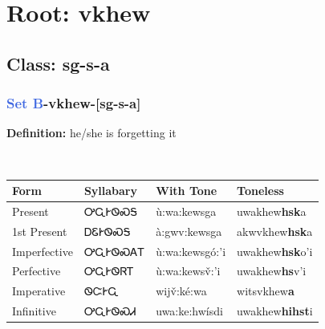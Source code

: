 \needspace{4in}
\section*{Root: vkhew}
\nopagebreak
{}
\needspace{3in}
\subsection*{Class: sg-s-a}
\nopagebreak
\needspace{2in}
\subsubsection*{\textcolor{RoyalBlue}{Set B}{-}\textbf{vkhew}{-}[sg-s-a]}
\nopagebreak
\textbf{Definition: } he/she is forgetting it
\\[0.5em]
\begin{tabularx}{\textwidth}{l X X X}%
\toprule%
\textbf{Form}&\textbf{Syllabary}&\textbf{With Tone}&\textbf{Toneless}\\%
\midrule%
Present&ᎤᏩᎨᏫᏍᎦ&ù:wa:kewsga&uwakhew\textbf{hsk}a\\%
1st Present&ᎠᏋᎨᏫᏍᎦ&à:gwv:kewsga&akwvkhew\textbf{hsk}a\\%
Imperfective&ᎤᏩᎨᏫᏍᎪᎢ&ù:wa:kewsgó:’i&uwakhew\textbf{hsk}o'i\\%
Perfective&ᎤᏩᎨᏫᏒᎢ&ù:wa:kewsv̌:’i&uwakhew\textbf{hs}v'i\\%
Imperative&ᏫᏨᎨᏩ&wijv̌:ké:wa&witsvkhew\textbf{a}\\%
Infinitive&ᎤᏩᎨᏫᏍᏗ&uwa:ke:hwísdi&uwakhew\textbf{hihst}i\\%
\bottomrule%
\end{tabularx}
\\[1em]
